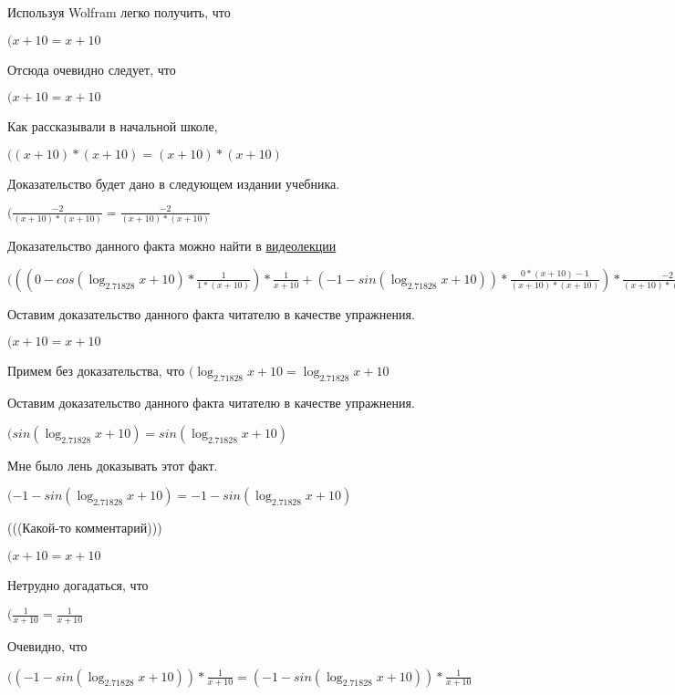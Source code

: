\documentclass[12pt,a4paper,fleqn]{article}
\theoremstyle{definition}
\begin{document}
Используя Wolfram легко получить, что

$( x  +  10  =  x  +  10 $

Отсюда очевидно следует, что

$( x  +  10  =  x  +  10 $

Как рассказывали в начальной школе,

$(( x  +  10 ) * ( x  +  10 ) = ( x  +  10 ) * ( x  +  10 )$

Доказательство будет дано в следующем издании учебника.

$(\frac{ -2 }{( x  +  10 ) * ( x  +  10 )}
 = \frac{ -2 }{( x  +  10 ) * ( x  +  10 )}
$

Доказательство данного факта можно найти в \href{https://www.youtube.com/watch?v=dQw4w9WgXcQ}{видеолекции}

$((( 0  - cos(\log_{ 2.71828 }{ x  +  10 }) * \frac{ 1 }{ 1  * ( x  +  10 )}
) * \frac{ 1 }{ x  +  10 }
 + ( -1  - sin(\log_{ 2.71828 }{ x  +  10 })) * \frac{ 0  * ( x  +  10 ) -  1 }{( x  +  10 ) * ( x  +  10 )}
) * \frac{ -2 }{( x  +  10 ) * ( x  +  10 )}
 = (( 0  - cos(\log_{ 2.71828 }{ x  +  10 }) * \frac{ 1 }{ 1  * ( x  +  10 )}
) * \frac{ 1 }{ x  +  10 }
 + ( -1  - sin(\log_{ 2.71828 }{ x  +  10 })) * \frac{ 0  * ( x  +  10 ) -  1 }{( x  +  10 ) * ( x  +  10 )}
) * \frac{ -2 }{( x  +  10 ) * ( x  +  10 )}
$

Оставим доказательство данного факта читателю в качестве упражнения.

$( x  +  10  =  x  +  10 $

Примем без доказательства, что
$(\log_{ 2.71828 }{ x  +  10 } = \log_{ 2.71828 }{ x  +  10 }$

Оставим доказательство данного факта читателю в качестве упражнения.

$(sin(\log_{ 2.71828 }{ x  +  10 }) = sin(\log_{ 2.71828 }{ x  +  10 })$

Мне было лень доказывать этот факт.

$( -1  - sin(\log_{ 2.71828 }{ x  +  10 }) =  -1  - sin(\log_{ 2.71828 }{ x  +  10 })$

(((Какой-то комментарий)))

$( x  +  10  =  x  +  10 $

Нетрудно догадаться, что

$(\frac{ 1 }{ x  +  10 }
 = \frac{ 1 }{ x  +  10 }
$

Очевидно, что

$(( -1  - sin(\log_{ 2.71828 }{ x  +  10 })) * \frac{ 1 }{ x  +  10 }
 = ( -1  - sin(\log_{ 2.71828 }{ x  +  10 })) * \frac{ 1 }{ x  +  10 }
$
\end{document}
